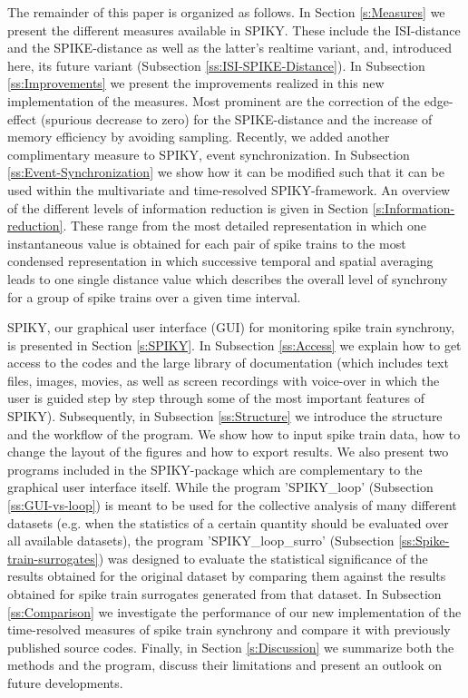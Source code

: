 \documentclass[10pt,twocolumn]{elsart5p}
\begin{document}
The remainder of this paper is organized as follows. In Section \ref{s:Measures} we present the different measures available in SPIKY. These include the ISI-distance and the SPIKE-distance as well as the latter's realtime variant, and, introduced here, its future variant (Subsection \ref{ss:ISI-SPIKE-Distance}). In Subsection \ref{ss:Improvements} we present the improvements realized in this new implementation of the measures. Most prominent are the correction of the edge-effect (spurious decrease to zero) for the SPIKE-distance and the increase of memory efficiency by avoiding sampling. Recently, we added another complimentary measure to SPIKY, event synchronization. In Subsection \ref{ss:Event-Synchronization} we show how it can be modified such that it can be used within the multivariate and time-resolved SPIKY-framework. An overview of the different levels of information reduction is given in Section \ref{s:Information-reduction}. These range from the most detailed representation in which one instantaneous value is obtained for each pair of spike trains to the most condensed representation in which successive temporal and spatial averaging leads to one single distance value which describes the overall level of synchrony for a group of spike trains over a given time interval.

SPIKY, our graphical user interface (GUI) for monitoring spike train synchrony, is presented in Section \ref{s:SPIKY}. In Subsection \ref{ss:Access} we explain how to get access to the codes and the large library of documentation (which includes text files, images, movies, as well as screen recordings with voice-over in which the user is guided step by step through some of the most important features of SPIKY). Subsequently, in Subsection \ref{ss:Structure} we introduce the structure and the workflow of the program. We show how to input spike train data, how to change the layout of the figures and how to export results. We also present two programs included in the SPIKY-package which are complementary to the graphical user interface itself. While the program 'SPIKY\_loop' (Subsection \ref{ss:GUI-vs-loop}) is meant to be used for the collective analysis of many different datasets (e.g. when the statistics of a certain quantity should be evaluated over all available datasets), the program 'SPIKY\_loop\_surro' (Subsection \ref{ss:Spike-train-surrogates}) was designed to evaluate the statistical significance of the results obtained for the original dataset by comparing them against the results obtained for spike train surrogates generated from that dataset. In Subsection \ref{ss:Comparison} we investigate the performance of our new implementation of the time-resolved measures of spike train synchrony and compare it with previously published source codes. Finally, in Section \ref{s:Discussion} we summarize both the methods and the program, discuss their limitations and present an outlook on future developments.
 
\end{document}
